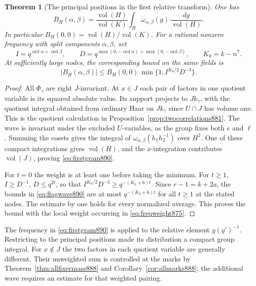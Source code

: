 \documentclass[a4paper,11pt]{article}
\newtheorem{theorem}[proposition]{Theorem}
\theoremstyle{definition}
\theoremstyle{remark}
\numberwithin{equation}{section}
\begin{document}
\begin{theorem}[The principal positions in the first relative transform]
\leavevmode\label{thm:firstgram890}
One has
\begin{equation}
 B_H(\alpha,\beta)=\frac{\operatorname{vol}(H)}{\operatorname{vol}(K)}
              \int_H\omega_{\alpha,\beta}(g)\,
                     \frac{dg}{\operatorname{vol}(H)} .
 \label{eq:firstgram890}
\end{equation}
In particular \(B_H(0,0)=\operatorname{vol}(H)/\operatorname{vol}(K)\).
For a rational nonzero frequency with split components
\(\alpha,\beta\), set
\[
 I=q^{\operatorname{ord}\alpha+\operatorname{ord}\beta},\qquad
 D=q^{\max(0,-\operatorname{ord}\alpha)+
        \max(0,-\operatorname{ord}\beta)},\qquad K_0=k-n^7 .
\]
At sufficiently large nodes, the corresponding bound on the
same fields is
\[
             |B_H(\alpha,\beta)|\le B_H(0,0)\,
                          \min\{1,I^{K_0/2}D^{-3}\}.
\]
\end{theorem}
\begin{proof}
All \(\Phi_\gamma\) are right \(J\)-invariant. At \(x\in J\)
each pair of factors in one quotient variable is its squared
absolute value. Its support projects to \(J k_\gamma\), with
the quotient integral obtained from ordinary Haar on
\(J k_\gamma\) since \(U\cap J\) has volume one. This is the
quotient calculation in Proposition~\ref{prop:twocorrelations881}.
The wave is invariant under the excluded \(U\)-variables, as
the group fixes both \(e\) and \(\ell\). Summing the cosets gives
the integral of \(\omega_{\alpha,\beta}(h_1h_2^{-1})\) over
\(H^2\). One of these compact integrations gives
\(\operatorname{vol}(H)\), and the \(x\)-integration contributes
\(\operatorname{vol}(J)\), proving \eqref{eq:firstgram890}.

For \(t=0\) the weight is at least one before taking the minimum.
For \(t\ge1\), \(I\ge D^{-1}\), \(D\le q^{2t}\), so that
\(I^{K_0/2}D^{-3}\ge q^{-(K_0+6)t}\).
Since \(r-1=k+2a\), the bounds in \eqref{eq:flagwave890} are
at most \(q^{-(K_0+6)t}\) for all \(t\ge1\) at the stated
nodes. The estimate by one holds for every normalized average.
This proves the bound with the local weight occurring in
\eqref{eq:freqweight875}.
\end{proof}

The frequency in \eqref{eq:firstgram890} is applied to the
relative element \(y(y')^{-1}\). Restricting to the principal
positions made its distribution a compact group integral.
For \(x\notin J\) the two factors in each quotient variable
are generally different. Their unweighted sum is controlled
at the marks by Theorem~\ref{thm:allfixermass888} and
Corollary~\ref{cor:allmarks888}; the additional wave requires
an estimate for that weighted pairing.
\clearpage
\end{document}
